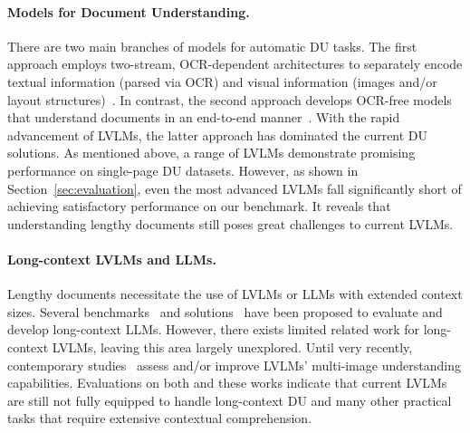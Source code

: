 \paragraph{Models for Document Understanding.} 
There are two main branches of models for automatic DU tasks. The first approach employs two-stream, OCR-dependent architectures to separately encode textual information (parsed via OCR) and visual information (images and/or layout structures)~\cite{LayoutLMv1, xu-etal-2021-layoutlmv2, LayoutLMv3}. In contrast, the second approach develops OCR-free models that understand documents in an end-to-end manner~\cite{kim2022donut, Pix2Struct}. With the rapid advancement of LVLMs, the latter approach has dominated the current DU solutions. As mentioned above, a range of LVLMs demonstrate promising performance on single-page DU datasets. However, as shown in Section~\ref{sec:evaluation}, even the most advanced LVLMs fall significantly short of achieving satisfactory performance on our benchmark. It reveals that understanding lengthy documents still poses great challenges to current LVLMs.


\paragraph{Long-context LVLMs and LLMs.} 
Lengthy documents necessitate the use of LVLMs or LLMs with extended context sizes. Several benchmarks~\cite{shaham-etal-2022-scrolls, an2023leval, bai2023longbench, zhang2024inftybench} and solutions~\cite{Tworkowski2023FocusedTC, Chen2023LongLoRAEF, Peng2023YaRNEC, bai2024longalign} have been proposed to evaluate and develop long-context LLMs. However, there exists limited related work for long-context LVLMs, leaving this area largely unexplored. Until very recently, contemporary studies~\cite{song2024milebench, jiang2024mantis, lu2024text} assess and/or improve LVLMs' multi-image understanding capabilities. Evaluations on both \benchmarkname and these works indicate that current LVLMs are still not fully equipped to handle long-context DU and many other practical tasks that require extensive contextual comprehension.